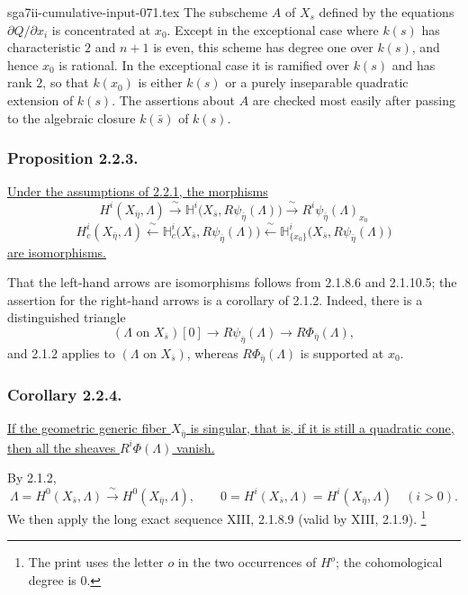 \begin{filecontents*}{sga7ii-cumulative-input-071.tex}
The subscheme $A$ of $X_s$ defined by the equations
$\partial Q/\partial x_i$ is concentrated at $x_0$.  Except in the
exceptional case where $k(s)$ has characteristic $2$ and $n+1$ is
even, this scheme has degree one over $k(s)$, and hence $x_0$ is
rational.  In the exceptional case it is ramified over $k(s)$ and
has rank $2$, so that $k(x_0)$ is either $k(s)$ or a purely
inseparable quadratic extension of $k(s)$.  The assertions about
$A$ are checked most easily after passing to the algebraic closure
$k(\bar s)$ of $k(s)$.

\subsubsection*{Proposition 2.2.3.}
\underline{Under the assumptions of 2.2.1, the morphisms}
\[
H^i(X_{\bar\eta},\Lambda)
 \xrightarrow{\ \sim\ }
\mathbb H^i\bigl(X_{\bar s},R\psi_{\bar\eta}(\Lambda)\bigr)
 \xrightarrow{\ \sim\ }
R^i\psi_{\bar\eta}(\Lambda)_{x_0}
\]
\[
H_c^i(X_{\bar\eta},\Lambda)
 \xleftarrow{\ \sim\ }
\mathbb H_c^i\bigl(X_{\bar s},R\psi_{\bar\eta}(\Lambda)\bigr)
 \xleftarrow{\ \sim\ }
\mathbb H^i_{\{x_0\}}\bigl(X_{\bar s},R\psi_{\bar\eta}(\Lambda)\bigr)
\]
\underline{are isomorphisms.}

That the left-hand arrows are isomorphisms follows from 2.1.8.6 and
2.1.10.5; the assertion for the right-hand arrows is a corollary of
2.1.2.  Indeed, there is a distinguished triangle
\[
(\Lambda\text{ on }X_{\bar s})[0]
 \longrightarrow R\psi_{\bar\eta}(\Lambda)
 \longrightarrow R\Phi_{\bar\eta}(\Lambda),
\]
and 2.1.2 applies to $(\Lambda\text{ on }X_{\bar s})$, whereas
$R\Phi_{\bar\eta}(\Lambda)$ is supported at $x_0$.

\subsubsection*{Corollary 2.2.4.}
\underline{If the geometric generic fiber $X_{\bar\eta}$ is
singular, that is, if it is still a quadratic cone, then all the
sheaves $R^i\Phi(\Lambda)$ vanish.}

By 2.1.2,
\[
\Lambda=H^0(X_{\bar s},\Lambda)
 \xrightarrow{\ \sim\ }H^0(X_{\bar\eta},\Lambda),
\qquad
0=H^i(X_{\bar s},\Lambda)=H^i(X_{\bar\eta},\Lambda)
\quad(i>0).
\]
We then apply the long exact sequence XIII, 2.1.8.9 (valid by
XIII, 2.1.9).
\footnote{The print uses the letter $o$ in the two occurrences of
$H^o$; the cohomological degree is $0$.}
\end{filecontents*}
